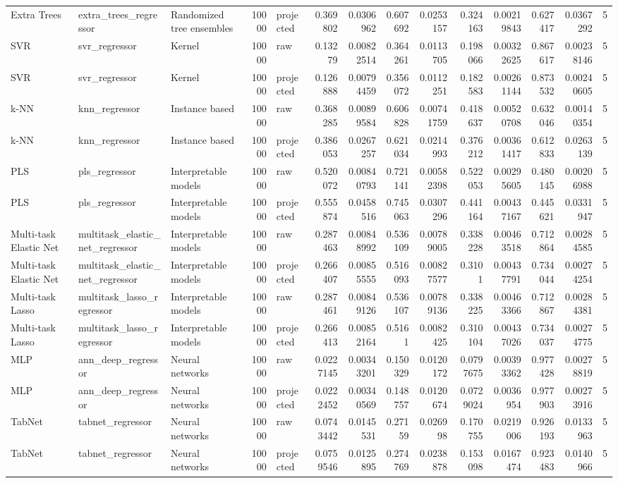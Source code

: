 \begin{tabular}{lllrlrrrrrrrrr}
Extra Trees & extra\_trees\_regressor & Randomized tree ensembles & 10000 & projected & 0.369802 & 0.0306962 & 0.607692 & 0.0253157 & 0.324163 & 0.00219843 & 0.627417 & 0.0367292 & 5 \\
SVR & svr\_regressor & Kernel & 10000 & raw & 0.13279 & 0.00822514 & 0.364261 & 0.0113705 & 0.198066 & 0.00322625 & 0.867617 & 0.00238146 & 5 \\
SVR & svr\_regressor & Kernel & 10000 & projected & 0.126888 & 0.00794459 & 0.356072 & 0.0112251 & 0.182583 & 0.00261144 & 0.873532 & 0.00240605 & 5 \\
k-NN & knn\_regressor & Instance based & 10000 & raw & 0.368285 & 0.00899584 & 0.606828 & 0.00741759 & 0.418637 & 0.00520708 & 0.632046 & 0.00140354 & 5 \\
k-NN & knn\_regressor & Instance based & 10000 & projected & 0.386053 & 0.0267257 & 0.621034 & 0.0214993 & 0.376212 & 0.00361417 & 0.612833 & 0.0263139 & 5 \\
PLS & pls\_regressor & Interpretable models & 10000 & raw & 0.520072 & 0.00840793 & 0.721141 & 0.00582398 & 0.522053 & 0.00295605 & 0.480145 & 0.00206988 & 5 \\
PLS & pls\_regressor & Interpretable models & 10000 & projected & 0.555874 & 0.0458516 & 0.745063 & 0.0307296 & 0.441164 & 0.00437167 & 0.445621 & 0.0331947 & 5 \\
Multi-task Elastic Net & multitask\_elastic\_net\_regressor & Interpretable models & 10000 & raw & 0.287463 & 0.00848992 & 0.536109 & 0.00789005 & 0.338228 & 0.00463518 & 0.712864 & 0.00284585 & 5 \\
Multi-task Elastic Net & multitask\_elastic\_net\_regressor & Interpretable models & 10000 & projected & 0.266407 & 0.00855555 & 0.516093 & 0.00827577 & 0.3101 & 0.00437791 & 0.734044 & 0.00274254 & 5 \\
Multi-task Lasso & multitask\_lasso\_regressor & Interpretable models & 10000 & raw & 0.287461 & 0.00849126 & 0.536107 & 0.00789136 & 0.338225 & 0.00463366 & 0.712867 & 0.00284381 & 5 \\
Multi-task Lasso & multitask\_lasso\_regressor & Interpretable models & 10000 & projected & 0.266413 & 0.00852164 & 0.5161 & 0.0082425 & 0.310104 & 0.00437026 & 0.734037 & 0.00274775 & 5 \\
MLP & ann\_deep\_regressor & Neural networks & 10000 & raw & 0.0227145 & 0.00343201 & 0.150329 & 0.0120172 & 0.0797675 & 0.00393362 & 0.977428 & 0.00278819 & 5 \\
MLP & ann\_deep\_regressor & Neural networks & 10000 & projected & 0.0222452 & 0.00340569 & 0.148757 & 0.0120674 & 0.0729024 & 0.0036954 & 0.977903 & 0.00273916 & 5 \\
TabNet & tabnet\_regressor & Neural networks & 10000 & raw & 0.0743442 & 0.0145531 & 0.27159 & 0.026998 & 0.170755 & 0.0219006 & 0.926193 & 0.0133963 & 5 \\
TabNet & tabnet\_regressor & Neural networks & 10000 & projected & 0.0759546 & 0.0125895 & 0.274769 & 0.0238878 & 0.153098 & 0.0167474 & 0.923483 & 0.0140966 & 5 \\
\bottomrule
\end{tabular}
